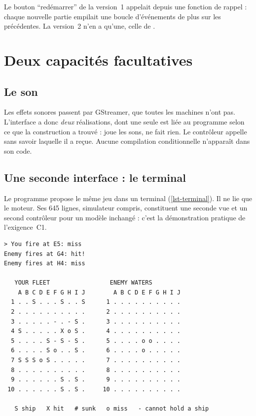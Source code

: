 \begin{attention}
    Le bouton \enquote{redémarrer} de la version~1 appelait  depuis une
    fonction de rappel : chaque nouvelle partie empilait une boucle d'événements de plus sur
    les précédentes. La version~2 n'en a qu'une, celle de .
\end{attention}

\section{Deux capacités facultatives}

\subsection{Le son}

Les effets sonores passent par GStreamer, que toutes les machines n'ont pas. L'interface
 a donc \emph{deux} réalisations, dont une seule est liée au programme
selon ce que la construction a trouvé :  joue les sons,
 ne fait rien. Le contrôleur appelle  sans
savoir laquelle il a reçue. Aucune compilation conditionnelle n'apparaît dans son code.

\subsection{Une seconde interface : le terminal}

Le programme  propose le même jeu dans un terminal
(\cref{lst-terminal}). Il ne lie que le moteur. Ses \num{645} lignes, simulateur compris,
constituent une seconde vue et un second contrôleur pour un modèle inchangé : c'est la
démonstration pratique de l'exigence~C1.

\begin{lstlisting}[language={}, basicstyle=\ttfamily\footnotesize,
                   caption={Extrait d'une partie dans un terminal
                            (\code{battleship-cli play -{}-seed 7 -{}-level hard}) : l'ordinateur
                            touche en G4, le modèle exclut les diagonales, puis il
                            cherche la suite du bateau.},
                   label={lst-terminal}]
> You fire at E5: miss
Enemy fires at G4: hit!
Enemy fires at H4: miss

   YOUR FLEET                 ENEMY WATERS
    A B C D E F G H I J        A B C D E F G H I J
  1 . . S . . . S . . S      1 . . . . . . . . . .
  2 . . . . . . . . . .      2 . . . . . . . . . .
  3 . . . . . - . - S .      3 . . . . . . . . . .
  4 S . . . . . X o S .      4 . . . . . . . . . .
  5 . . . . S - S - S .      5 . . . . o o . . . .
  6 . . . . S o . . S .      6 . . . . o . . . . .
  7 S S S o S . . . . .      7 . . . . . . . . . .
  8 . . . . . . . . . .      8 . . . . . . . . . .
  9 . . . . . . S . S .      9 . . . . . . . . . .
 10 . . . . . . S . S .     10 . . . . . . . . . .

   S ship   X hit   # sunk   o miss   - cannot hold a ship
\end{lstlisting}
